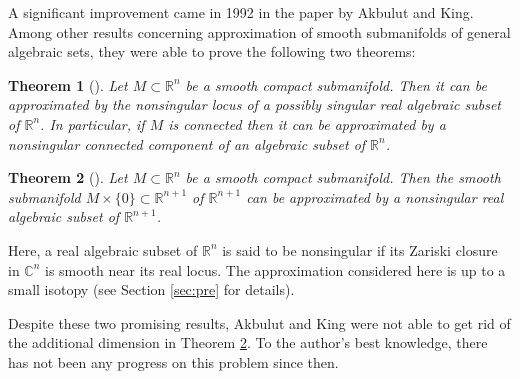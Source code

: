 \documentclass{amsart}
\theoremstyle{plain}
\newtheorem{thm}{Theorem}[section]
\theoremstyle{definition}
\theoremstyle{remark}
\numberwithin{equation}{thm} %
\newcommand{\R}{\mathbb{R}}
\newcommand{\C}{\mathbb{C}}
\begin{document}
A significant improvement came in 1992 in the paper \cite{akbulutApproximatingSubmanifoldsAlgebraic1992} by Akbulut and King. Among other results concerning approximation of smooth submanifolds of general algebraic sets, they were able to prove the following two theorems:
\begin{thm}[{\cite[Theorem A]{akbulutApproximatingSubmanifoldsAlgebraic1992}}]\label{thm:AKWeak}
Let $M\subset \R^n$ be a smooth compact submanifold. Then it can be approximated by the nonsingular locus of a possibly singular real algebraic subset of $\R^{n}$. In particular, if $M$ is connected then it can be approximated by a nonsingular connected component of an algebraic subset of $\R^n$.
\end{thm}
\begin{thm}[{\cite[Theorem B]{akbulutApproximatingSubmanifoldsAlgebraic1992}}]\label{thm:AKStrong}
Let $M\subset \R^n$ be a smooth compact submanifold. Then the smooth submanifold $M\times\{0\}\subset \R^{n+1}$ of $\R^{n+1}$ can be approximated by a nonsingular real algebraic subset of $\R^{n+1}$.
\end{thm}
Here, a real algebraic subset of $\R^n$ is said to be nonsingular if its Zariski closure in $\C^n$ is smooth near its real locus. The approximation considered here is up to a small isotopy (see Section \ref{sec:pre} for details).

Despite these two promising results, Akbulut and King were not able to get rid of the additional dimension in Theorem \ref{thm:AKStrong}. To the author's best knowledge, there has not been any progress on this problem since then.
\end{document}
